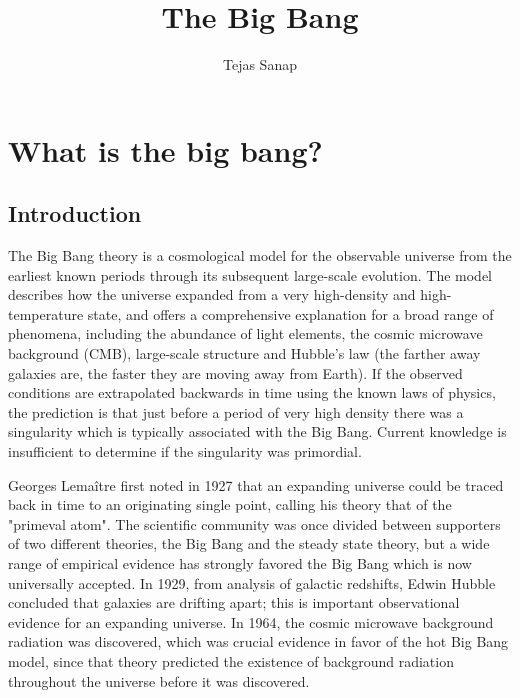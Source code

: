 \documentclass[14pt, oneside]{book}
\title{\large The Big Bang}
\author{Tejas Sanap}
\begin{document}
\frontmatter

\maketitle
\tableofcontents
\listoffigures

\mainmatter

\chapter{What is the big bang?}
	\section{Introduction}
		The Big Bang theory is a cosmological model for the observable universe from the earliest known periods through its subsequent large-scale evolution. The model describes how the universe expanded from a very high-density and high-temperature state, and offers a comprehensive explanation for a broad range of phenomena, including the abundance of light elements, the cosmic microwave background (CMB), large-scale structure and Hubble's law (the farther away galaxies are, the faster they are moving away from Earth). If the observed conditions are extrapolated backwards in time using the known laws of physics, the prediction is that just before a period of very high density there was a singularity which is typically associated with the Big Bang. Current knowledge is insufficient to determine if the singularity was primordial.
	
		Georges Lemaître first noted in 1927 that an expanding universe could be traced back in time to an originating single point, calling his theory that of the "primeval atom". The scientific community was once divided between supporters of two different theories, the Big Bang and the steady state theory, but a wide range of empirical evidence has strongly favored the Big Bang which is now universally accepted. In 1929, from analysis of galactic redshifts, Edwin Hubble concluded that galaxies are drifting apart; this is important observational evidence for an expanding universe. In 1964, the cosmic microwave background radiation was discovered, which was crucial evidence in favor of the hot Big Bang model, since that theory predicted the existence of background radiation throughout the universe before it was discovered.
	
\end{document}
